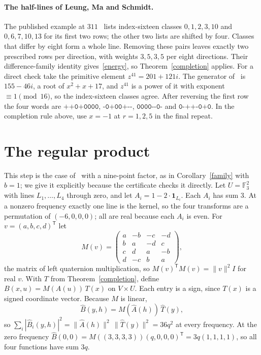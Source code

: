 \documentclass[11pt]{article}
\theoremstyle{remark}
\newcommand{\F}{\mathbb F}
\newcommand{\one}{\mathbf 1}
\begin{document}
\paragraph{The half-lines of Leung, Ma and Schmidt.}
The published example at $311$~\cite[Appendix~3]{LMS} lists index-sixteen classes $0,1,2,3,10$ and $0,6,7,10,13$ for its first two rows; the other two lists are shifted by four. Classes that differ by eight form a whole line. Removing these pairs leaves exactly two prescribed rows per direction, with weights $3,5,3,5$ per eight directions. Their difference-family identity gives~\eqref{energy}, so Theorem~\ref{completion} applies. For a direct check take the primitive element $z^{41}=201+121i$. The generator of~\cite{LMS} is $155-46i$, a root of $x^2+x+17$, and $z^{41}$ is a power of it with exponent $\equiv1\pmod{16}$, so the index-sixteen classes agree. After reversing the first row the four words are $\texttt{++0+0000}$, $\texttt{-0+00+-{}-}$, $\texttt{0000-{}-0-}$ and $\texttt{0-++-0+0}$. In the completion rule above, use $x=-1$ at $r=1,2,5$ in the final repeat.

\section{The regular product}\label{sec:product}
This step is the case of~\cite[Theorem~4]{XXS} with a nine-point factor, as in Corollary~\ref{family} with $b=1$; we give it explicitly because the certificate checks it directly. Let $U=\F_3^2$ with lines $L_1,\ldots,L_4$ through zero, and let $A_i=1-2\cdot\one_{L_i}$. Each $A_i$ has sum $3$. At a nonzero frequency exactly one line is the kernel, so the four transforms are a permutation of $(-6,0,0,0)$; all are real because each $A_i$ is even. For $v=(a,b,c,d)^{\mathsf T}$ let
\[
 M(v)=\begin{pmatrix}a&-b&-c&-d\\ b&a&-d&c\\ c&d&a&-b\\ d&-c&b&a\end{pmatrix},
\]
the matrix of left quaternion multiplication, so $M(v)^{\mathsf T}M(v)=\|v\|^2I$ for real $v$. With $T$ from Theorem~\ref{completion}, define $B(x,u)=M(A(u))\,T(x)$ on $V\times U$. Each entry is a sign, since $T(x)$ is a signed coordinate vector. Because $M$ is linear,
\[
 \widehat B(y,h)=M(\widehat A(h))\,\widehat T(y),
\]
so $\sum_i|\widehat B_i(y,h)|^2=\|\widehat A(h)\|^2\,\|\widehat T(y)\|^2=36q^2$ at every frequency. At the zero frequency $\widehat B(0,0)=M((3,3,3,3))(q,0,0,0)^{\mathsf T}=3q(1,1,1,1)$, so all four functions have sum $3q$.
\end{document}
